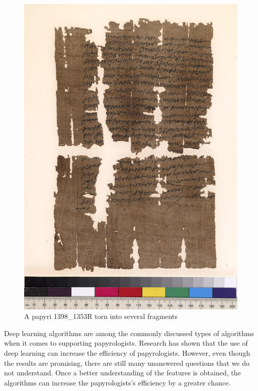 \begin{figure}[t]	
	\includegraphics[width=\textwidth]{figures/0_papyri_sample.jpg}
	\caption{A papyri 1398\_1353R torn into several fragments}
	\label{fig:papyri_sample}
\end{figure}
%
\noindent Deep learning algorithms are among the commonly discussed types of algorithms when it comes to supporting papyrologists. Research has shown that the use of deep learning can increase the efficiency of papyrologists. However, even though the results are promising, there are still many unanswered questions that we do not understand. Once a better understanding of the features is obtained, the algorithms can increase the papyrologists's efficiency by a greater chance. 

